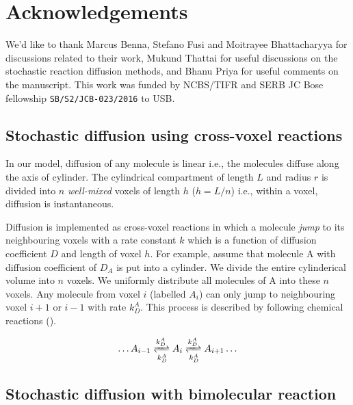 \documentclass[9pt,lineno]{elife}
\begin{document}
{%
\section{Acknowledgements}
We'd like to thank Marcus Benna, Stefano Fusi and Moitrayee Bhattacharyya for
discussions related to their work, Mukund Thattai for useful discussions on the
stochastic reaction diffusion methods, and Bhanu Priya for useful comments on
the manuscript. This work was funded by NCBS/TIFR and SERB JC Bose fellowship
\texttt{SB/S2/JCB-023/2016} to USB.

 

\appendix
\begin{appendixbox}

\subsection*{Stochastic diffusion using cross-voxel reactions}\label{sec:diff_as_gillespie}

In our model, diffusion of any molecule is linear i.e., the molecules diffuse
along the axis of cylinder. The cylindrical compartment of length $L$ and radius $r$
is divided into $n$ \emph{well-mixed} voxels of length $h$ ($h=L/n$) i.e., within
a voxel, diffusion is instantaneous.  

Diffusion is implemented as cross-voxel reactions in which a molecule
\emph{jump} to its neighbouring voxels with a rate constant $k$ which is a
function of diffusion coefficient $D$ and length of voxel $h$. For example,
assume that molecule A with diffusion coefficient of $D_A$ is put into a
cylinder. We divide the entire cylinderical volume into $n$ voxels. We uniformly
distribute all molecules of A into these $n$ voxels. Any molecule from voxel $i$
(labelled $A_i$) can only jump to neighbouring voxel $i+1$ or $i-1$ with rate
$k_D^A$. This process is described by following chemical reactions ().

\begin{equation}
\begin{gathered}
    \ldots A_{i-1} \xrightleftharpoons[k_D^A]{k_D^A} A_{i}
    \xrightleftharpoons[k_D^A]{k_D^A} A_{i+1} \ldots
\end{gathered}
\label{eq:stoch_diff}
\end{equation}


\subsection*{Stochastic diffusion with bimolecular reaction}\label{subsec:rdme}


\end{appendixbox}}
\end{document}
